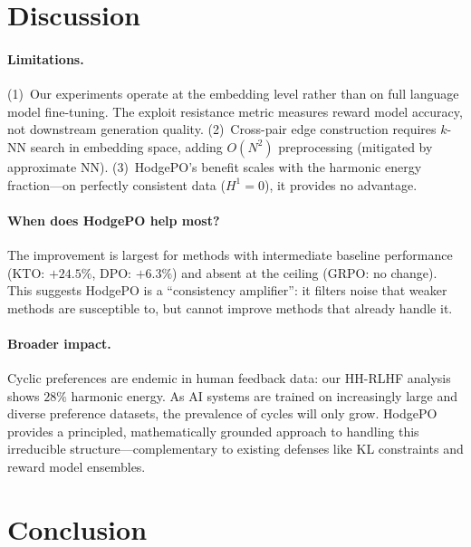 \documentclass{article}
\begin{document}
\section{Discussion}
\label{sec:discussion}

\paragraph{Limitations.} (1)~Our experiments operate at the embedding level rather than on full language model fine-tuning. The exploit resistance metric measures reward model accuracy, not downstream generation quality. (2)~Cross-pair edge construction requires $k$-NN search in embedding space, adding $O(N^2)$ preprocessing (mitigated by approximate NN). (3)~HodgePO's benefit scales with the harmonic energy fraction---on perfectly consistent data ($H^1 = 0$), it provides no advantage.

\paragraph{When does HodgePO help most?} The improvement is largest for methods with intermediate baseline performance (KTO: $+24.5\%$, DPO: $+6.3\%$) and absent at the ceiling (GRPO: no change). This suggests HodgePO is a ``consistency amplifier'': it filters noise that weaker methods are susceptible to, but cannot improve methods that already handle it.

\paragraph{Broader impact.} Cyclic preferences are endemic in human feedback data: our HH-RLHF analysis shows $28\%$ harmonic energy. As AI systems are trained on increasingly large and diverse preference datasets, the prevalence of cycles will only grow. HodgePO provides a principled, mathematically grounded approach to handling this irreducible structure---complementary to existing defenses like KL constraints and reward model ensembles.

\section{Conclusion}
\label{sec:conclusion}
\end{document}
